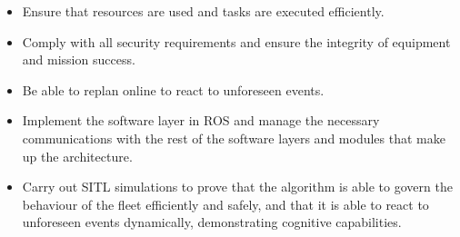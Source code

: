 \begin{itemize}
    \item Ensure that resources are used and tasks are executed efficiently.
    \item Comply with all security requirements and ensure the integrity of equipment and mission success.
    \item Be able to replan online to react to unforeseen events.
    \item Implement the software layer in \gls{ROS} and manage the necessary communications with the rest of the software layers and modules that make up the architecture.
    \item Carry out \gls{SITL} simulations to prove that the algorithm is able to govern the behaviour of the fleet efficiently and safely, and that it is able to react to unforeseen events dynamically, demonstrating cognitive capabilities.
\end{itemize}



\endinput